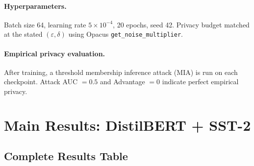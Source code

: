 \documentclass[11pt,letterpaper]{article}
\newcommand{\eps}{\varepsilon}
\begin{document}
\paragraph{Hyperparameters.}
Batch size 64, learning rate $5 \times 10^{-4}$, 20 epochs, seed 42.
Privacy budget matched at the stated $(\eps, \delta)$ using Opacus
\texttt{get\_noise\_multiplier}.

\paragraph{Empirical privacy evaluation.}
After training, a threshold membership inference attack (MIA) is run
on each checkpoint.
Attack AUC $= 0.5$ and Advantage $= 0$ indicate perfect empirical privacy.

\bigskip
\section{Main Results: DistilBERT + SST-2}

\subsection{Complete Results Table}
\end{document}
